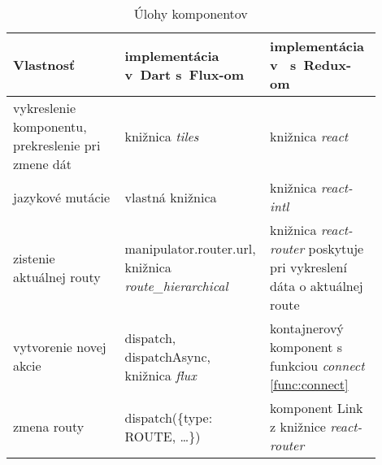 \begin{comment}
\paragraph{Komponenty v JavaScript-e s Redux-om}
V JavaScriptovej aplikácii máme dva typy komponentov: kontajnerové a prezenčné. 

Prezenčné sú jednoduchšie, priamočiarejšie. Všetky parametre, ktoré potrebujú, by mali dostať od volajúceho komponentu (vrátane funkcií na vytváranie akcií). Nemajú prístup ku celému stavu aplikácie. Mali by to byť hlavne znovu použiteľné komponenty (napríklad riadok tabuľky).

Kontajnerové komponenty sú o niečo zložitejšie. Majú prístup ku celému stavu aplikácie, z ktorého si vyberajú len potrebné časti. Na to nám pomáha funkcia \emph{connect} z knižnice \emph{react-redux}. Kontajnerový komponent vyzerá podobne ako prezenčný, tiež všetko vykresľuje len zo svojich parametrov. 
Funkcia \emph{connect} tvorí medzivrstvu medzi týmto komponentom a jeho exportovaným variantom. Do tohto komponentu doplní potrebné dáta zo stavu. Tieto komponenty sú však menej univerzálne, keďže sú viazané na konkrétne dáta zo stavu.
\end{comment}

\begin{table}
  \caption{Úlohy komponentov}
  \label{table:components}
  \begin{tabular}{| p{0.3\linewidth} | p{0.3\linewidth} | p{0.3\linewidth} |}
   \hline
     Vlastnosť & implementácia v~Dart s~Flux-om & implementácia v~\JS{} s~Redux-om \\
    \hline
    \hline
     vykreslenie komponentu, prekreslenie pri zmene dát & 
     knižnica \emph{tiles} &
     knižnica \emph{react} \\
    \hline
     jazykové mutácie & 
     vlastná knižnica & 
     knižnica \emph{react-intl} \\
    \hline
     zistenie aktuálnej routy & 
     manipulator.router.url, knižnica \emph{route\_hierarchical} & 
     knižnica \emph{react-router} poskytuje pri vykreslení dáta o aktuálnej route \\
    \hline
     vytvorenie novej akcie & 
     dispatch, dispatchAsync, knižnica \emph{flux} & 
     kontajnerový komponent s funkciou \emph{connect} \ref{func:connect} \\
    \hline
     zmena routy & 
     dispatch(\{type: ROUTE, \ldots\}) & 
     komponent Link z knižnice \emph{react-router} \\
    \hline
   \end{tabular}
\end{table}

